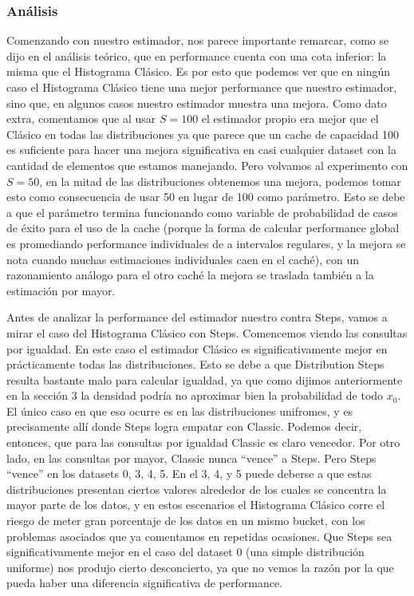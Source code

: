 \subsubsection*{Análisis}
Comenzando con nuestro estimador, nos parece importante remarcar, como se dijo en el análisis teórico, que en performance cuenta con una cota inferior: la misma que el Histograma Clásico. Es por esto que podemos ver que en ningún caso el Histograma Clásico tiene una mejor performance que nuestro estimador, sino que, en algunos casos nuestro estimador muestra una mejora. Como dato extra, comentamos que al usar $S=100$ el estimador propio era mejor que el Clásico en todas las distribuciones ya que parece que un cache de capacidad 100 es suficiente para hacer una mejora significativa en casi cualquier dataset con la cantidad de elementos que estamos manejando. Pero volvamos al experimento con $S=50$, en la mitad de las distribuciones obtenemos una mejora, podemos tomar esto como consecuencia de usar 50 en lugar de 100 como parámetro. Esto se debe a que el parámetro termina funcionando como variable de probabilidad de casos de éxito para el uso de la cache (porque la forma de calcular performance global es promediando performance individuales de a intervalos regulares, y la mejora se nota cuando muchas estimaciones individuales caen en el caché), con un razonamiento análogo para el otro caché la mejora se traslada también a la estimación por mayor.

Antes de analizar la performance del estimador nuestro contra Steps, vamos a mirar el caso del Histograma Clásico con Steps. Comencemos viendo las consultas por igualdad. En este caso el estimador Clásico es significativamente mejor en prácticamente todas las distribuciones. Esto se debe a que Distribution Steps resulta bastante malo para calcular igualdad, ya que como dijimos anteriormente en la sección 3 la densidad podría no aproximar bien la probabilidad de todo $x_0$. El único caso en que eso ocurre es en las distribuciones unifromes, y es precisamente allí donde Steps logra empatar con Classic. Podemos decir, entonces, que para las consultas por igualdad Classic es claro vencedor.
Por otro lado, en las consultas por mayor, Classic nunca ``vence'' a Steps. Pero Steps ``vence'' en los datasets 0, 3, 4, 5. En el 3, 4, y 5 puede deberse a que estas distribuciones presentan ciertos valores alrededor de los cuales se concentra la mayor parte de los datos, y en estos escenarios el Histograma Clásico corre el riesgo de meter gran porcentaje de los datos en un mismo bucket, con los problemas asociados que ya comentamos en repetidas ocasiones. Que Steps sea significativamente mejor en el caso del dataset 0 (una simple distribución uniforme) nos produjo cierto desconcierto, ya que no vemos la razón por la que pueda haber una diferencia significativa de performance.

